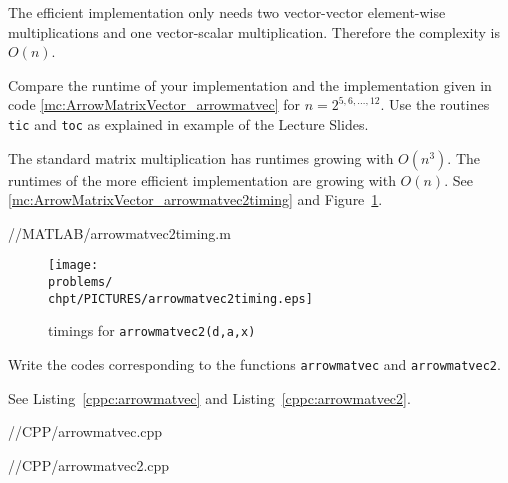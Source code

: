\begin{problem}
\begin{subproblem}[1]
\begin{solution}
The efficient implementation only needs two vector-vector element-wise multiplications and one vector-scalar multiplication. Therefore the complexity is $O(n)$.
\end{solution}
\end{subproblem}


\begin{subproblem}[2] \label{subprb:ArrowMatrixVector_5}
Compare the runtime of your implementation and the implementation given in code \ref{mc:ArrowMatrixVector_arrowmatvec} for $n=2^{5,6,\ldots,12}$.
Use the routines \texttt{tic} and \texttt{toc} as explained in example  of the Lecture Slides.

\begin{solution}
The standard matrix multiplication has runtimes growing with $O(n^3)$.
The runtimes of the more efficient implementation are growing with $O(n)$.
See \autoref{mc:ArrowMatrixVector_arrowmatvec2timing} and Figure~\ref{fig:arrowmatvec2timing}.


{\problems/\chpt/MATLAB/arrowmatvec2timing.m}

\begin{figure}[ht]
\centering
\texttt{[image: \\problems/\\chpt/PICTURES/arrowmatvec2timing.eps]}
\caption{timings for \texttt{arrowmatvec2(d,a,x)}} \label{fig:arrowmatvec2timing}
\end{figure}
\end{solution}
\end{subproblem}

\begin{subproblem}[1] \label{subprb:ArrowMatrixVector_6}
Write the \eigen{} codes corresponding to the functions \texttt{arrowmatvec} and \texttt{arrowmatvec2}.

\begin{solution}
See Listing~\ref{cppc:arrowmatvec} and Listing~\ref{cppc:arrowmatvec2}.


{\problems/\chpt/CPP/arrowmatvec.cpp}


{\problems/\chpt/CPP/arrowmatvec2.cpp}
\end{solution}
\end{subproblem}

\end{problem}
